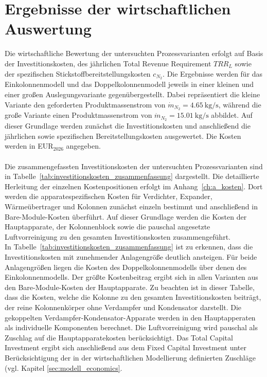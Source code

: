 \section{Ergebnisse der wirtschaftlichen Auswertung}
\label{sec:ergebnisse_wirtschaft}


Die wirtschaftliche Bewertung der untersuchten Prozessvarianten erfolgt auf
Basis der Investitionskosten, des jährlichen Total Revenue Requirement
\(TRR_L\) sowie der spezifischen Stickstoffbereitstellungskosten \(c_{N_2}\).
Die Ergebnisse werden für das Einkolonnenmodell und das Doppelkolonnenmodell
jeweils in einer kleinen und einer großen Auslegungsvariante gegenübergestellt.
Dabei repräsentiert die kleine Variante den geforderten Produktmassenstrom von
\(\dot{m}_{N_2}=\SI{4.65}{\kilogram\per\second}\), während die große Variante
einen Produktmassenstrom von \(\dot{m}_{N_2}=\SI{15.01} {\kilogram\per\second}\) abbildet. Auf dieser Grundlage werden zunächst die Investitionskosten und anschließend die jährlichen sowie spezifischen Bereitstellungskosten ausgewertet. Die Kosten werden in EUR$_{2026}$ angegeben.\\
\\
Die zusammengefassten Investitionskosten der untersuchten Prozessvarianten sind
in Tabelle~\ref{tab:investitionskosten_zusammenfassung} dargestellt. Die
detaillierte Herleitung der einzelnen Kostenpositionen erfolgt im
Anhang~\ref{ch:a_kosten}. Dort werden die apparatespezifischen Kosten für
Verdichter, Expander, Wärmeübertrager und Kolonnen zunächst einzeln bestimmt
und anschließend in Bare-Module-Kosten überführt. Auf dieser Grundlage werden
die Kosten der Hauptapparate, der Kolonnenblock sowie die pauschal angesetzte
Luftvorreinigung zu den gesamten Investitionskosten zusammengeführt. \\
In Tabelle~\ref{tab:investitionskosten_zusammenfassung} ist zu erkennen, dass die Investitionskosten mit zunehmender Anlagengröße deutlich ansteigen. Für beide Anlagengrößen liegen die Kosten des Doppelkolonnenmodells über denen des Einkolonnenmodells. Der größte Kostenbeitrag ergibt sich in allen Varianten aus den Bare-Module-Kosten der Hauptapparate. Zu beachten ist in dieser Tabelle, dass die Kosten, welche die Kolonne zu den gesamten Investitionskosten beiträgt, der reine Kolonnenkörper ohne Verdampfer und Kondensator darstellt. Die gekoppelten Verdampfer-Kondensator-Apparate werden in den Hauptapperaten als individuelle Komponenten berechnet. Die Luftvorreinigung wird pauschal als Zuschlag auf die Hauptapparatekosten berücksichtigt.
Das Total Capital Investment ergibt sich anschließend aus dem Fixed Capital Investment unter Berücksichtigung der in der wirtschaftlichen Modellierung definierten Zuschläge (vgl. Kapitel \ref{sec:modell_economics}.


